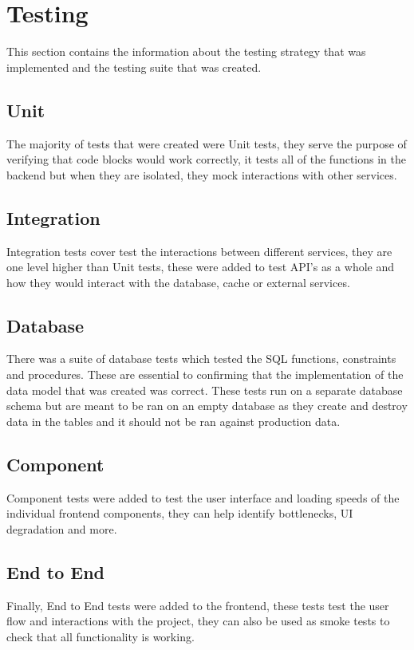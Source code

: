 \documentclass[]{project_report}
\begin{document}
\section{Testing}
This section contains the information about the testing strategy that was implemented and the testing suite that was created.

\subsection{Unit}
The majority of tests that were created were Unit tests, they serve the purpose of verifying that code blocks would work correctly, it tests all of the functions in the backend but when they are isolated, they mock interactions with other services. 

\subsection{Integration}
Integration tests cover test the interactions between different services, they are one level higher than Unit tests, these were added to test API's as a whole and how they would interact with the database, cache or external services.

\subsection{Database}
There was a suite of database tests which tested the SQL functions, constraints and procedures. These are essential to confirming that the implementation of the data model that was created was correct. These tests run on a separate database schema but are meant to be ran on an empty database as they create and destroy data in the tables and it should not be ran against production data.

\subsection{Component}
Component tests were added to test the user interface and loading speeds of the individual frontend components, they can help identify bottlenecks, UI degradation and more.

\subsection{End to End}
Finally, End to End tests were added to the frontend, these tests test the user flow and interactions with the project, they can also be used as smoke tests to check that all functionality is working.
\end{document}
